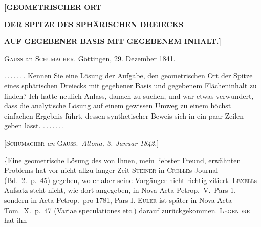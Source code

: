 \clearpage{}
\begin{center}
\textbf{[GEOMETRISCHER ORT}\par\medskip
\textbf{DER SPITZE DES SPHÄRISCHEN DREIECKS}\par\medskip
\textbf{AUF GEGEBENER BASIS MIT GEGEBENEM INHALT.]}
\end{center}

\medskip

\begin{center}
\textsc{Gauss} an \textsc{Schumacher}. Göttingen, 29. Dezember 1841.
\end{center}

\mbox{.\,.\,.\,.\,.\,.\,.} Kennen Sie eine  Lösung der Aufgabe, den geometrischen Ort der Spitze eines sphärischen Dreiecks mit gegebener Basis und gegebenem Flächeninhalt zu finden? Ich hatte neulich Anlass, danach zu suchen, und war etwas verwundert, dass die analytische Lösung auf einem gewissen Umweg zu einem höchst einfachen Ergebnis führt, dessen synthetischer Beweis sich in ein paar Zeilen geben lässt. \mbox{.\,.\,.\,.\,.\,.\,.}

\medskip

\begin{center}
[\textsc{Schumacher} \emph{an} \textsc{Gauss}.\ \emph{Altona, 3. Januar 1842.}]
\end{center}

\{Eine geometrische Lösung des von Ihnen, mein liebster Freund, erwähnten Problems hat vor nicht allzu langer Zeit \textsc{Steiner} in \textsc{Crelle}s Journal (Bd.\ 2.\ p.\ 45) gegeben, wo er aber seine Vorgänger nicht richtig zitiert. \textsc{Lexell}s Aufsatz steht nicht, wie dort angegeben, in Nova Acta Petrop.\ V.\ Pars 1, sondern in Acta Petrop.\ pro 1781, Pars I. \textsc{Euler} ist später in Nova Acta Tom.\ X.\ p.\ 47 (Variae speculationes etc.) darauf zurückgekommen. \textsc{Legendre} hat ihn
